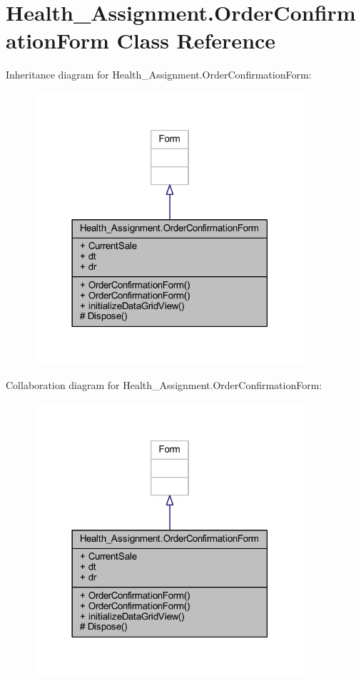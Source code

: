 \hypertarget{class_health___assignment_1_1_order_confirmation_form}{}\section{Health\+\_\+\+Assignment.\+Order\+Confirmation\+Form Class Reference}
\label{class_health___assignment_1_1_order_confirmation_form}


Inheritance diagram for Health\+\_\+\+Assignment.\+Order\+Confirmation\+Form\+:\nopagebreak
\begin{figure}[H]
\begin{center}
\leavevmode
\includegraphics[width=285pt]{class_health___assignment_1_1_order_confirmation_form__inherit__graph}
\end{center}
\end{figure}


Collaboration diagram for Health\+\_\+\+Assignment.\+Order\+Confirmation\+Form\+:\nopagebreak
\begin{figure}[H]
\begin{center}
\leavevmode
\includegraphics[width=285pt]{class_health___assignment_1_1_order_confirmation_form__coll__graph}
\end{center}
\end{figure}
